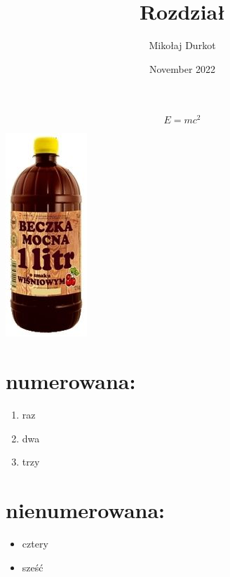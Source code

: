 \documentclass{article}
\title{Rozdział}
\author{Mikołaj Durkot}
\date{November 2022}
\begin{document}
\maketitle

\[E=mc^2\]

\begin{center}
   \includegraphics{Pictures/napuj_boguw.jpg} 
    \label{fig:zdjecie}
\end{center}

\begin{table}[]
\label{fig:tabela}
\end{table}

\section{numerowana:}
\begin{enumerate}
    \item raz
    \item dwa
    \item trzy
\end{enumerate}


\section{nienumerowana:}
\begin{itemize}
    \item cztery
    \item sześć
\end{itemize}
\end{document}
